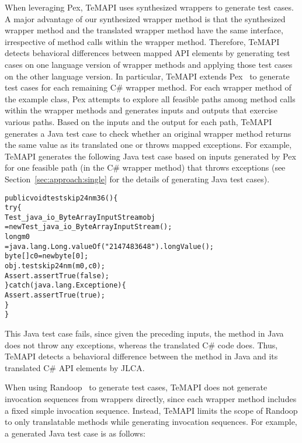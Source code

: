When leveraging Pex, TeMAPI uses synthesized wrappers to generate test cases. A major advantage of our synthesized wrapper method is that the synthesized wrapper method and the translated wrapper method have the same interface, irrespective of method calls within the wrapper method. Therefore, TeMAPI detects behavioral differences between mapped API elements by generating test cases on one language version of wrapper methods and applying those test cases on the other language version. In particular, TeMAPI extends Pex~\citep{tillmann2008pex} to generate test cases for each remaining C\# wrapper method. For each wrapper method of the example class, Pex attempts to explore all feasible paths among method calls within the wrapper methods and generates inputs and outputs that exercise various paths. Based on the inputs and the output for each path, TeMAPI generates a Java test case to check whether an original wrapper method returns the same value as its translated one or throws mapped exceptions. For example, TeMAPI generates the following Java test case based on inputs generated by Pex for one feasible path (in the C\# wrapper method) that throws exceptions (see Section~\ref{sec:approach:single} for the details of generating Java test cases).

\begin{CodeOut}%
\begin{alltt}
public void testskip24nm36()\{
  try\{
     Test_java_io_ByteArrayInputStream obj
      = new Test_java_io_ByteArrayInputStream();
     long m0
      = java.lang.Long.valueOf("2147483648").longValue();
     byte[] c0 = new byte[0];
     obj.testskip24nm(m0,c0);
     Assert.assertTrue(false);
  \}catch(java.lang.Exception e)\{
     Assert.assertTrue(true);
  \}
\}
\end{alltt}
\end{CodeOut}%

This Java test case fails, since given the preceding inputs, the  method in Java does not throw any exceptions, whereas the translated C\# code does. Thus, TeMAPI detects a behavioral difference between the  method in Java and its translated C\# API elements by JLCA.

When using Randoop~\citep{pacheco2007feedback} to generate test cases, TeMAPI does not generate invocation sequences from wrappers directly, since each wrapper method includes a fixed simple invocation sequence. Instead, TeMAPI limits the scope of Randoop to only translatable methods while generating invocation sequences. For example, a generated Java test case is as follows:

